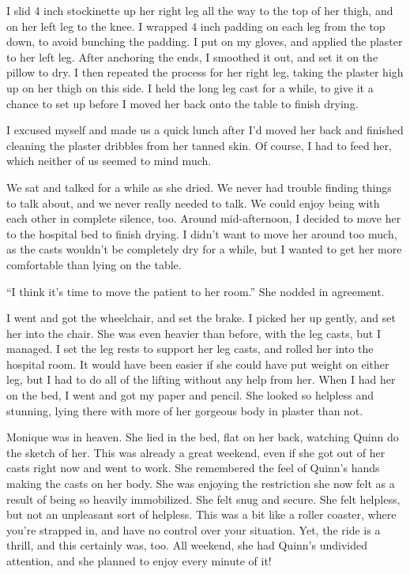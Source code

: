 I slid 4 inch stockinette up her right leg all the way to the top of her thigh, and on her
left leg to the knee. I wrapped 4 inch padding on each leg from the top down, to avoid bunching
the padding. I put on my gloves, and applied the plaster to her left leg. After anchoring the
ends, I smoothed it out, and set it on the pillow to dry. I then repeated the process for her
right leg, taking the plaster high up on her thigh on this side. I held the long leg cast for a
while, to give it a chance to set up before I moved her back onto the table to finish drying.

I excused myself and made us a quick lunch after I'd moved her back and finished cleaning
the plaster dribbles from her tanned skin. Of course, I had to feed her, which neither of us
seemed to mind much.

We sat and talked for a while as she dried. We never had trouble finding things to talk
about, and we never really needed to talk. We could enjoy being with each other in complete
silence, too. Around mid-afternoon, I decided to move her to the hospital bed to finish drying.
I didn’t want to move her around too much, as the casts wouldn't be completely dry for a while,
but I wanted to get her more comfortable than lying on the table.

``I think it's time to move the patient to her room.'' She nodded in agreement.

I went and got the wheelchair, and set the brake. I picked her up gently, and set her into
the chair. She was even heavier than before, with the leg casts, but I managed. I set the leg
rests to support her leg casts, and rolled her into the hospital room. It would have been easier
if she could have put weight on either leg, but I had to do all of the lifting without any help
from her. When I had her on the bed, I went and got my paper and pencil. She looked so helpless
and stunning, lying there with more of her gorgeous body in plaster than not.

\begin{thought}
Monique was in heaven. She lied in the bed, flat on her back, watching Quinn do the sketch
of her. This was already a great weekend, even if she got out of her casts right now and went to
work. She remembered the feel of Quinn's hands making the casts on her body. She was enjoying
the restriction she now felt as a result of being so heavily immobilized. She felt snug and
secure. She felt helpless, but not an unpleasant sort of helpless. This was a bit like a roller
coaster, where you're strapped in, and have no control over your situation. Yet, the ride is a
thrill, and this certainly was, too. All weekend, she had Quinn's undivided attention, and she
planned to enjoy every minute of it!
\end{thought}

